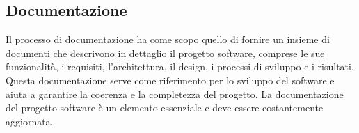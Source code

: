 \subsection{Documentazione}
Il processo di documentazione ha come scopo quello di fornire un insieme di documenti che descrivono in dettaglio il progetto software, comprese le sue funzionalità, i requisiti, l'architettura, il design, i processi di sviluppo e i risultati. 
Questa documentazione serve come riferimento per lo sviluppo del software e aiuta a garantire la coerenza e la completezza del progetto. 
La documentazione del progetto software è un elemento essenziale e deve essere costantemente aggiornata.








